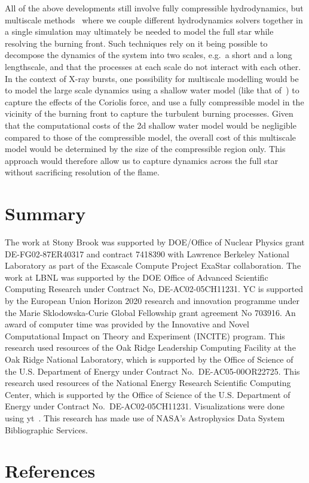 \documentclass[a4paper]{jpconf}
\newcommand{\MarginPar}[1]{\marginpar{\vskip-\baselineskip\raggedright\tiny\sffamily\hrule\smallskip{\color{red}#1}\par\smallskip\hrule}}
\begin{document}
All of the above developments still involve fully compressible
hydrodynamics, but multiscale methods~\cite{weinan2011principles} where we couple different hydrodynamics
solvers together in a single simulation may ultimately be needed to model the full star while resolving the burning front. \MarginPar{Alice and Ian contribute here}
Such techniques rely on it being possible to decompose the dynamics of the system
into two scales, e.g.~a short and a long lengthscale, and that the processes at each
scale do not interact with each other. In the context of X-ray bursts, one possibility for
multiscale modelling would be to model the large scale dynamics using a shallow water model
(like that of~\cite{SPIT_ETAL02}) to capture the effects of the Coriolis force, and use
a fully compressible model in the vicinity of the burning front to capture
the turbulent burning processes. Given that the computational costs of the 2d shallow water model
would be negligible compared to those of the compressible model, the overall cost of 
this multiscale model would be determined by the size of the compressible region only. This
approach would therefore allow us to capture dynamics across the full star
without sacrificing resolution of the flame.



\section{Summary}

\ack The work at Stony Brook was supported by DOE/Office of Nuclear
Physics grant DE-FG02-87ER40317 and contract 7418390 with Lawrence
Berkeley National Laboratory as part of the Exascale Compute Project
ExaStar collaboration.  The work at LBNL was supported by the DOE
Office of Advanced Scientific Computing Research under Contract No,
DE-AC02-05CH11231. YC is supported by the European Union Horizon 2020
research and innovation programme under the Marie Sklodowska-Curie
Global Fellowship grant agreement No 703916.  An award of computer
time was provided by the Innovative and Novel Computational Impact on
Theory and Experiment (INCITE) program. This research used resources
of the Oak Ridge Leadership Computing Facility at the Oak Ridge
National Laboratory, which is supported by the Office of Science of
the U.S. Department of Energy under Contract No.\ DE-AC05-00OR22725.
This research used resources of the National Energy Research
Scientific Computing Center, which is supported by the Office of
Science of the U.S. Department of Energy under Contract
No.\ DE-AC02-05CH11231.  Visualizations were done using yt~\cite{yt}.
This research has made use of NASA's Astrophysics Data System
Bibliographic Services.


\section*{References}



\end{document}
